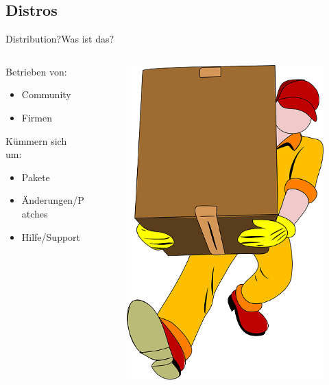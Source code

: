 

\subsection{Distros}
\begin{frame}{Distribution?}{Was ist das?}
\begin{columns}
\begin{column}{0.6\textwidth}
Betrieben von: 
\begin{itemize}
 \item Community
 \item Firmen
\end{itemize}
Kümmern sich um:  
\begin{itemize}
 \item Pakete
 \item Änderungen/Patches
 \item Hilfe/Support
\end{itemize}
 
 \end{column}
\begin{column}{0.4\textwidth}
 \begin{figure}
 \includegraphics[height=0.5\textheight]{resources/movers-24402_640.png}
 \end{figure}
\end{column}
\end{columns}
 \end{frame}



